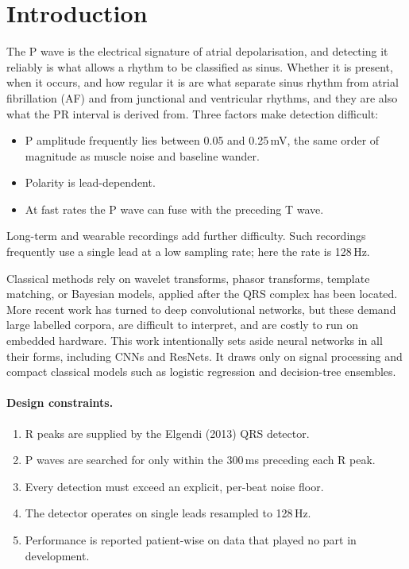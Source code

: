 \documentclass[11pt,a4paper]{article}
\begin{document}
\section{Introduction}

The P wave is the electrical signature of atrial depolarisation, and detecting it reliably is what allows a rhythm to be classified as sinus. Whether it is present, when it occurs, and how regular it is are what separate sinus rhythm from atrial fibrillation (AF) and from junctional and ventricular rhythms, and they are also what the PR interval is derived from. Three factors make detection difficult:
\begin{itemize}
\item P amplitude frequently lies between 0.05 and 0.25\,mV, the same order of magnitude as muscle noise and baseline wander.
\item Polarity is lead-dependent.
\item At fast rates the P wave can fuse with the preceding T wave.
\end{itemize}
Long-term and wearable recordings add further difficulty. Such recordings frequently use a single lead at a low sampling rate; here the rate is 128\,Hz.

Classical methods rely on wavelet transforms, phasor transforms, template matching, or Bayesian models, applied after the QRS complex has been located. More recent work has turned to deep convolutional networks, but these demand large labelled corpora, are difficult to interpret, and are costly to run on embedded hardware. This work intentionally sets aside neural networks in all their forms, including CNNs and ResNets. It draws only on signal processing and compact classical models such as logistic regression and decision-tree ensembles.

\paragraph{Design constraints.}
\begin{enumerate}
\item R peaks are supplied by the Elgendi (2013) QRS detector.
\item P waves are searched for only within the 300\,ms preceding each R peak.
\item Every detection must exceed an explicit, per-beat noise floor.
\item The detector operates on single leads resampled to 128\,Hz.
\item Performance is reported patient-wise on data that played no part in development.
\end{enumerate}
\end{document}

